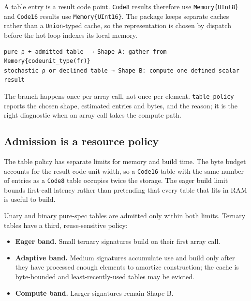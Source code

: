 \label{1423166724807744070}{}


A table entry is a result code point. \texttt{Code8} results therefore use \texttt{Memory\{UInt8\}} and \texttt{Code16} results use \texttt{Memory\{UInt16\}}. The package keeps separate caches rather than a \texttt{Union}-typed cache, so the representation is chosen by dispatch before the hot loop indexes its local memory.




\begin{verbatim}
pure ρ + admitted table  → Shape A: gather from Memory{codeunit_type(fr)}
stochastic ρ or declined table → Shape B: compute one defined scalar result
\end{verbatim}



The branch happens once per array call, not once per element. \texttt{table\_\allowbreak{}policy} reports the chosen shape, estimated entries and bytes, and the reason; it is the right diagnostic when an array call takes the compute path.



\subsection{Admission is a resource policy}



\label{2267551939831985612}{}


The table policy has separate limits for memory and build time. The byte budget accounts for the result code-unit width, so a \texttt{Code16} table with the same number of entries as a \texttt{Code8} table occupies twice the storage. The eager build limit bounds first-call latency rather than pretending that every table that fits in RAM is useful to build.



Unary and binary pure-spec tables are admitted only within both limits. Ternary tables have a third, reuse-sensitive policy:



\begin{itemize}
\item \textbf{Eager band.} Small ternary signatures build on their first array call.


\item \textbf{Adaptive band.} Medium signatures accumulate use and build only after they have processed enough elements to amortize construction; the cache is byte-bounded and least-recently-used tables may be evicted.


\item \textbf{Compute band.} Larger signatures remain Shape B.

\end{itemize}


